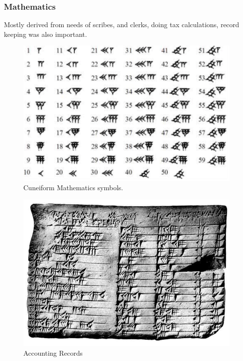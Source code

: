 \documentclass[11pt]{article}
\begin{document}
\subsubsection{Mathematics}
\label{sec-3-8-5}
Mostly derived from needs of scribes, and clerks, doing tax calculations, record keeping was also important.

\begin{figure}[htb]
\centering
\includegraphics[width=.9\linewidth]{./img/CuneMath.png}
\caption{Cuneiform Mathematics symbols.}
\end{figure}

\begin{figure}[htb]
\centering
\includegraphics[width=.9\linewidth]{./img/acctRecs.png}
\caption{Accounting Records}
\end{figure}
\end{document}
